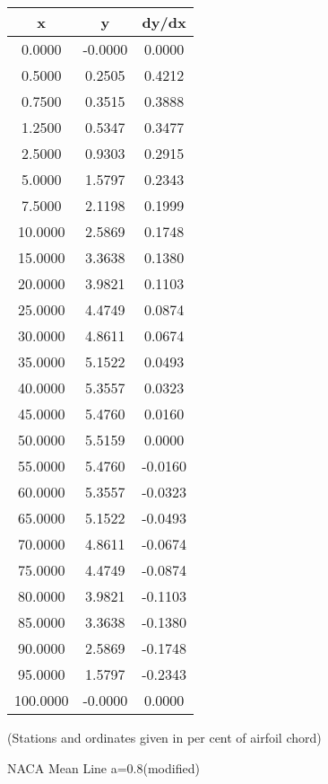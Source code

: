 \documentclass[11pt]{book}
\begin{document}
 \vspace{8mm}
 \begin{tabular}{|c|c|c|}  \hline
 x & y & dy/dx \\
 \hline
0.0000 & -0.0000 & 0.0000 \\
0.5000 & 0.2505 & 0.4212 \\
0.7500 & 0.3515 & 0.3888 \\
1.2500 & 0.5347 & 0.3477 \\
2.5000 & 0.9303 & 0.2915 \\
5.0000 & 1.5797 & 0.2343 \\
7.5000 & 2.1198 & 0.1999 \\
10.0000 & 2.5869 & 0.1748 \\
15.0000 & 3.3638 & 0.1380 \\
20.0000 & 3.9821 & 0.1103 \\
25.0000 & 4.4749 & 0.0874 \\
30.0000 & 4.8611 & 0.0674 \\
35.0000 & 5.1522 & 0.0493 \\
40.0000 & 5.3557 & 0.0323 \\
45.0000 & 5.4760 & 0.0160 \\
50.0000 & 5.5159 & 0.0000 \\
55.0000 & 5.4760 & -0.0160 \\
60.0000 & 5.3557 & -0.0323 \\
65.0000 & 5.1522 & -0.0493 \\
70.0000 & 4.8611 & -0.0674 \\
75.0000 & 4.4749 & -0.0874 \\
80.0000 & 3.9821 & -0.1103 \\
85.0000 & 3.3638 & -0.1380 \\
90.0000 & 2.5869 & -0.1748 \\
95.0000 & 1.5797 & -0.2343 \\
100.0000 & -0.0000 & 0.0000 \\
 \hline
 \end{tabular}
 \vspace{8mm}

(Stations and ordinates given in per cent of airfoil chord)

 \newpage
 \label{mla=0.8(modified)}
 \begin{Large}
 NACA Mean Line a=0.8(modified)
 \end{Large}
  
\end{document}
